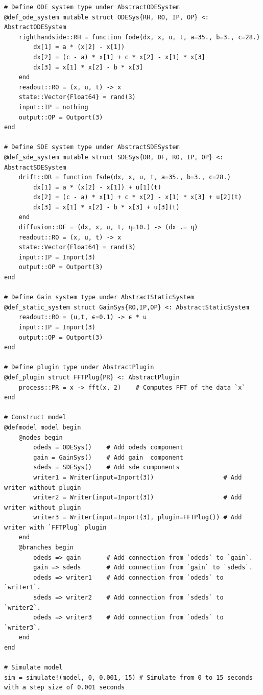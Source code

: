 \documentclass{juliacon}
\begin{document}
{\begin{lstlisting}
# Define ODE system type under AbstractODESystem
@def_ode_system mutable struct ODESys{RH, RO, IP, OP} <: AbstractODESystem
    righthandside::RH = function fode(dx, x, u, t, a=35., b=3., c=28.)
        dx[1] = a * (x[2] - x[1])
        dx[2] = (c - a) * x[1] + c * x[2] - x[1] * x[3]
        dx[3] = x[1] * x[2] - b * x[3]
    end
    readout::RO = (x, u, t) -> x 
    state::Vector{Float64} = rand(3)
    input::IP = nothing
    output::OP = Outport(3)
end

# Define SDE system type under AbstractSDESystem
@def_sde_system mutable struct SDESys{DR, DF, RO, IP, OP} <: AbstractSDESystem
    drift::DR = function fsde(dx, x, u, t, a=35., b=3., c=28.)
        dx[1] = a * (x[2] - x[1]) + u[1](t)
        dx[2] = (c - a) * x[1] + c * x[2] - x[1] * x[3] + u[2](t)
        dx[3] = x[1] * x[2] - b * x[3] + u[3](t)
    end
    diffusion::DF = (dx, x, u, t, η=10.) -> (dx .= η) 
    readout::RO = (x, u, t) -> x
    state::Vector{Float64} = rand(3)
    input::IP = Inport(3)
    output::OP = Outport(3)
end

# Define Gain system type under AbstractStaticSystem
@def_static_system struct GainSys{RO,IP,OP} <: AbstractStaticSystem 
    readout::RO = (u,t, ϵ=0.1) -> ϵ * u 
    input::IP = Inport(3)
    output::OP = Outport(3)
end 

# Define plugin type under AbstractPlugin
@def_plugin struct FFTPlug{PR} <: AbstractPlugin 
    process::PR = x -> fft(x, 2)    # Computes FFT of the data `x`
end 

# Construct model
@defmodel model begin 
    @nodes begin 
        odeds = ODESys()    # Add odeds component  
        gain = GainSys()    # Add gain  component   
        sdeds = SDESys()    # Add sde components
        writer1 = Writer(input=Inport(3))                   # Add writer without plugin
        writer2 = Writer(input=Inport(3))                   # Add writer without plugin
        writer3 = Writer(input=Inport(3), plugin=FFTPlug()) # Add writer with `FFTPlug` plugin
    end
    @branches begin 
        odeds => gain       # Add connection from `odeds` to `gain`.
        gain => sdeds       # Add connection from `gain` to `sdeds`.
        odeds => writer1    # Add connection from `odeds` to `writer1`.
        sdeds => writer2    # Add connection from `sdeds` to `writer2`.
        odeds => writer3    # Add connection from `odeds` to `writer3`.
    end 
end 

# Simulate model 
sim = simulate!(model, 0, 0.001, 15) # Simulate from 0 to 15 seconds with a step size of 0.001 seconds


\end{lstlisting}}
\end{document}
